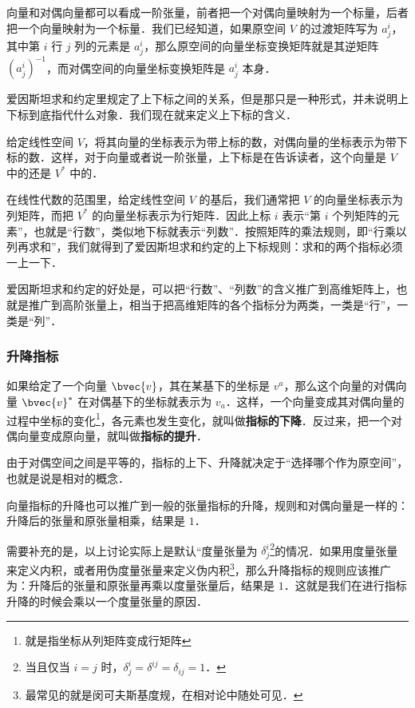 向量和对偶向量都可以看成一阶张量，前者把一个对偶向量映射为一个标量，后者把一个向量映射为一个标量．我们已经知道，如果原空间 $V$ 的过渡矩阵写为 $a^i_j$，其中第 $i$ 行 $j$ 列的元素是 $a^i_j$，那么原空间的向量坐标变换矩阵就是其逆矩阵 $(a^i_j)^{-1}$，而对偶空间的向量坐标变换矩阵是 $a^i_j$ 本身．

爱因斯坦求和约定里规定了上下标之间的关系，但是那只是一种形式，并未说明上下标到底指代什么对象．我们现在就来定义上下标的含义．

\begin{definition}{}
给定线性空间 $V$，将其向量的坐标表示为带上标的数，对偶向量的坐标表示为带下标的数．这样，对于向量或者说一阶张量，上下标是在告诉读者，这个向量是 $V$ 中的还是 $V^*$ 中的．
\end{definition}

在线性代数的范围里，给定线性空间 $V$ 的基后，我们通常把 $V$ 的向量坐标表示为列矩阵，而把 $V^*$ 的向量坐标表示为行矩阵．因此上标 $i$ 表示“第 $i$ 个列矩阵的元素”，也就是“行数”，类似地下标就表示“列数”．按照矩阵的乘法规则，即“行乘以列再求和”，我们就得到了爱因斯坦求和约定的上下标规则：求和的两个指标必须一上一下．

爱因斯坦求和约定的好处是，可以把“行数”、“列数”的含义推广到高维矩阵上，也就是推广到高阶张量上，相当于把高维矩阵的各个指标分为两类，一类是“行”，一类是“列”．

\subsubsection{升降指标}

如果给定了一个向量 $\bvec{v}$，其在某基下的坐标是 $v^a$，那么这个向量的对偶向量 $\bvec{v}^*$ 在对偶基下的坐标就表示为 $v_a$．这样，一个向量变成其对偶向量的过程中坐标的变化\footnote{就是指坐标从列矩阵变成行矩阵}，各元素也发生变化，就叫做\textbf{指标的下降}．反过来，把一个对偶向量变成原向量，就叫做\textbf{指标的提升}．

由于对偶空间之间是平等的，指标的上下、升降就决定于“选择哪个作为原空间”，也就是说是相对的概念．

向量指标的升降也可以推广到一般的张量指标的升降，规则和对偶向量是一样的：升降后的张量和原张量相乘，结果是 $1$．

需要补充的是，以上讨论实际上是默认“度量张量为 $\delta^i_j$\footnote{当且仅当 $i=j$ 时，$\delta^i_j=\delta^{ij}=\delta_{ij}=1$．}的情况．如果用度量张量来定义内积，或者用伪度量张量来定义伪内积\footnote{最常见的就是闵可夫斯基度规，在相对论中随处可见．}，那么升降指标的规则应该推广为：升降后的张量和原张量再乘以度量张量后，结果是 $1$．这就是我们在进行指标升降的时候会乘以一个度量张量的原因．

